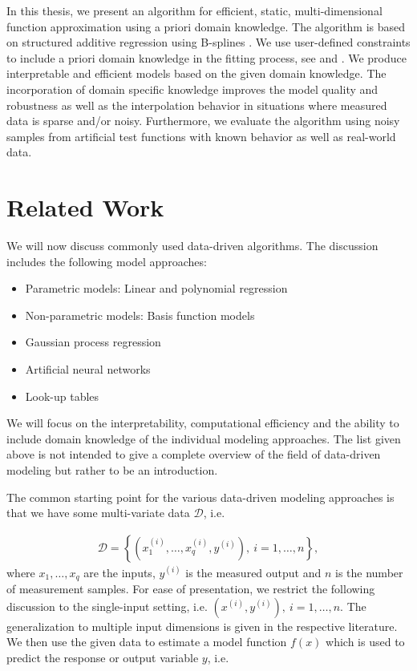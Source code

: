 In this thesis, we present an algorithm for efficient, static, multi-dimensional function approximation using a priori domain knowledge. The algorithm is based on structured additive regression using B-splines \cite{fahrmeir2007regression}. We use user-defined constraints to include a priori domain knowledge in the fitting process, see \cite{hofner2011monotonicity} and \cite{bollaerts2006simple}. We produce interpretable and efficient models based on the given domain knowledge. The incorporation of domain specific knowledge improves the model quality and robustness as well as the interpolation behavior in situations where measured data is sparse and/or noisy. Furthermore, we evaluate the algorithm using noisy samples from artificial test functions with known behavior as well as real-world data.
\section{Related Work}

We will now discuss commonly used data-driven algorithms. The discussion includes the following model approaches:

\begin{itemize}
	\item Parametric models: Linear and polynomial regression
	\item Non-parametric models: Basis function models
	\item Gaussian process regression
	\item Artificial neural networks
	\item Look-up tables
\end{itemize}
%
We will focus on the interpretability, computational efficiency and the ability to include domain knowledge of the individual modeling approaches. The list given above is not intended to give a complete overview of the field of data-driven modeling but rather to be an introduction.

The common starting point for the various data-driven modeling approaches is that we have some multi-variate data $\mathcal{D}$, i.e.

\begin{align}
	\mathcal{D} = \left\{ (x_1^{(i)}, \dots, x_q^{(i)}, y^{(i)} ), \ i = 1, \dots, n\right\},
\end{align} 
%
where $x_1, \dots, x_q$ are the inputs, $y^{(i)}$ is the measured output and $n$ is the number of measurement samples. For ease of presentation, we restrict the following discussion to the single-input setting, i.e. $(x^{(i)}, y^{(i)}), \ i=1, \dots, n$. The generalization to multiple input dimensions is given in the respective literature. We then use the given data to estimate a model function $f(x)$  which is used to predict the response or output variable $y$, i.e.

